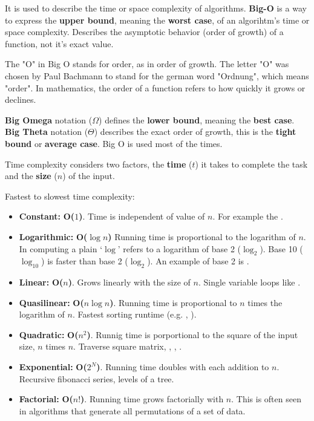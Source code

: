 It is used to describe the time or space complexity of algorithms. \textbf{Big-O} is a way to express the \textbf{upper bound}, meaning the \textbf{worst case}, of an algorihtm's time or space complexity. Describes the asymptotic behavior (order of growth) of a function, not it's exact value.

The "O" in Big O stands for order, as in order of growth. The letter "O" was chosen by Paul Bachmann to stand for the german word "Ordnung", which means "order". In mathematics, the order of a function refers to how quickly it grows or declines.

\textbf{Big Omega} notation ($\Omega$) defines the \textbf{lower bound}, meaning the \textbf{best case}. \textbf{Big Theta} notation ($\Theta$) describes the exact order of growth, this is the \textbf{tight bound} or \textbf{average case}. Big O is used most of the times.

Time complexity considers two factors, the \textbf{time} ($t$) it takes to complete the task and the \textbf{size} ($n$) of the input.

Fastest to slowest time complexity:

\begin{itemize}
  \item \textbf{Constant:} \textbf{O($1$)}. Time is independent of value of $n$. For example the \sumathsrs.
  \item \textbf{Logarithmic:} \textbf{O($\log n$)} Running time is proportional to the logarithm of $n$. In computing a plain `$\log$' refers to a logarithm of base 2 ($\log_2$). Base 10 ($\log_{10}$) is faster than base 2 ($\log_2$). An example of base 2 is \binarysch.
  \item \textbf{Linear:} \textbf{O($n$)}. Grows linearly with the size of $n$. Single variable loops like \linearsch.
  \item \textbf{Quasilinear:} \textbf{O($n \log n$)}. Running time is proportional to $n$ times the logarithm of $n$. Fastest sorting runtime (e.g. \mergesrt, \heapsrt).
  \item \textbf{Quadratic:} \textbf{O($n^2$)}. Runnig time is porportional to the square of the input size, $n$ times $n$. Traverse square matrix, \bubblesrt, \selectionsrt, \insertionsrt.
  \item \textbf{Exponential:} \textbf{O($2^N$)}. Running time doubles with each addition to $n$. Recursive fibonacci series, levels of a tree.
  \item \textbf{Factorial:} \textbf{O($n!$)}. Running time grows factorially with $n$. This is often seen in algorithms that generate all permutations of a set of data.
\end{itemize}

